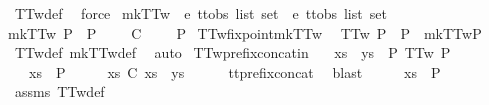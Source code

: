\begin{isabellebody}
\ TT{}w{\isacharunderscore}def\ \isamarkupfalse%
\ force%
\endisatagproof
{\isafoldproof}%
%
\isadelimproof
\isanewline
%
\endisadelimproof
\isanewline
{}\isamarkupfalse%
\ mkTT{}w\ {\isacharcolon}{\isacharcolon}\ {\isachardoublequoteopen}{\isacharprime}e\ ttobs\ list\ set\ {\isasymRightarrow}\ {\isacharprime}e\ ttobs\ list\ set{\isachardoublequoteclose}\ \isanewline
{\isachardoublequoteopen}mkTT{}w\ P\ {\isacharequal}\ P\ {\isasymunion}\ {\isacharbraceleft}{\isasymrho}{\isacharbar}{\isasymrho}\ {\isasymsigma}{\isachardot}\ {\isasymrho}\ {\isasymle}\isactrlsub C\ {\isasymsigma}\ {\isasymand}\ {\isasymsigma}\ {\isasymin}\ P{\isacharbraceright}{\isachardoublequoteclose}\isanewline
\isanewline
{}\isamarkupfalse%
\ TT{}w{\isacharunderscore}fixpoint{\isacharunderscore}mkTT{}w{\isacharcolon}\isanewline
\ \ {\isachardoublequoteopen}TT{}w\ P\ {\isacharequal}\ {\isacharparenleft}P\ {\isacharequal}\ mkTT{}w{\isacharparenleft}P{\isacharparenright}{\isacharparenright}{\isachardoublequoteclose}\isanewline
%
\isadelimproof
\ \ %
\endisadelimproof
%
\isatagproof
{}\isamarkupfalse%
\ TT{}w{\isacharunderscore}def\ mkTT{}w{\isacharunderscore}def\ \isamarkupfalse%
\ auto%
\endisatagproof
{\isafoldproof}%
%
\isadelimproof
\isanewline
%
\endisadelimproof
\isanewline
{}\isamarkupfalse%
\ TT{}w{\isacharunderscore}prefix{\isacharunderscore}concat{\isacharunderscore}in{\isacharcolon}\isanewline
\ \ \ {\isachardoublequoteopen}xs\ {\isacharat}\ ys\ {\isasymin}\ P{\isachardoublequoteclose}\ {\isachardoublequoteopen}TT{}w\ P{\isachardoublequoteclose}\isanewline
\ \ \ {\isachardoublequoteopen}xs\ {\isasymin}\ P{\isachardoublequoteclose}\isanewline
%
\isadelimproof
%
\endisadelimproof
%
\isatagproof
{}\isamarkupfalse%
\ {\isacharminus}\isanewline
\ \ \isamarkupfalse%
\ {\isachardoublequoteopen}xs\ {\isasymle}\isactrlsub C\ xs\ {\isacharat}\ ys{\isachardoublequoteclose}\isanewline
\ \ \ \ \isamarkupfalse%
\ tt{\isacharunderscore}prefix{\isacharunderscore}concat\ \isamarkupfalse%
\ blast\isanewline
\ \ \isamarkupfalse%
\ \isamarkupfalse%
\ {\isachardoublequoteopen}xs\ {\isasymin}\ P{\isachardoublequoteclose}\isanewline
\ \ \ \ \isamarkupfalse%
\ assms\ TT{}w{\isacharunderscore}def\ \isamarkupfalse%

\end{isabellebody}
